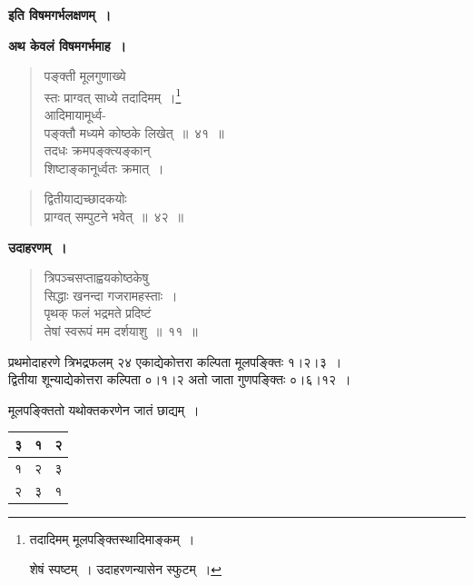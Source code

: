 \documentclass[11pt, openany]{book}
\begin{document}
\begin{center}
\textbf{इति विषमगर्भलक्षणम्~।}
\end{center}
\vspace{2mm}

\textbf{अथ केवलं विषमगर्भमाह~।}

\begin{quote}
{\gk पङ्क्ती मूलगुणाख्ये\\
स्तः प्राग्वत् साध्ये तदादिमम्~।\renewcommand{\thefootnote}{१}\footnote{तदादिमम् मूलपङ्क्तिस्थादिमाङ्कम्~।

\hspace{3mm} शेषं स्पष्टम्~। उदाहरणन्यासेन स्फुटम्~।}\\
आदिमायामूर्ध्व-\\
पङ्क्तौ मध्यमे कोष्ठके लिखेत्~॥~४१~॥\\
तदधः क्रमपङ्क्त्यङ्कान्\\
शिष्टाङ्कानूर्ध्वतः क्रमात्~।}
\end{quote}

\newpage

\begin{quote}
{\gk द्वितीयाद्यच्छादकयोः\\
प्राग्वत् सम्पुटने भवेत्~॥~४२~॥	}
\end{quote}

\textbf{उदाहरणम्~।}

\begin{quote}
{\ex त्रिपञ्चसप्ताह्वयकोष्ठकेषु\\
सिद्धाः खनन्दा गजरामहस्ताः~।\\
पृथक् फलं भद्रमते प्रदिष्टं\\
तेषां स्वरूपं मम दर्शयाशु~॥~११~॥}	
\end{quote}

प्रथमोदाहरणे त्रिभद्रफलम् २४ एकाद्येकोत्तरा कल्पिता मूलपङ्क्तिः १।२।३~।\\

द्वितीया शून्याद्येकोत्तरा कल्पिता ०।१।२ अतो जाता गुणपङ्क्तिः ०।६।१२~।

\begin{center}
मूलपङ्क्तितो यथोक्तकरणेन जातं छाद्यम्~।
\end{center}
\vspace{-4mm}

\begin{table}[h]
	\centering
\begin{tabular}{|c|c|c|}
	\hline
३ & १ & २\\
\hline
१ & २ & ३\\
\hline
२ & ३ & १\\
\hline
\end{tabular}
\end{table}
\vspace{-2mm}
\end{document}
